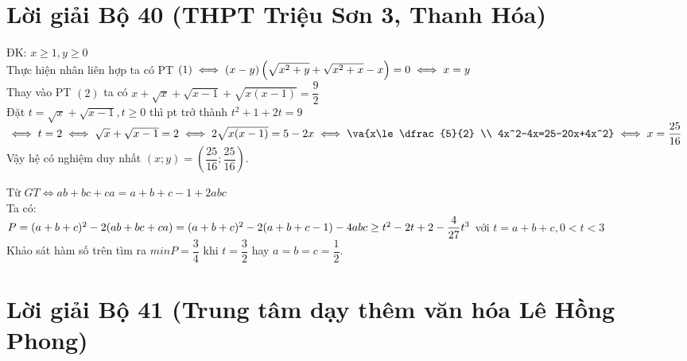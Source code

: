 \section{Lời giải Bộ 40 (THPT Triệu Sơn 3, Thanh Hóa)}

\lgi 
\vspace{5cm}

\hda 
ĐK: $x\ge 1,y\ge 0$\\
Thực hiện nhân liên hợp ta có PT $(1)\iff (x-y)\left(\sqrt{x^2+y}+\sqrt{x^2+x}-x\right)=0\\
\iff x=y$\\
Thay vào PT $(2)$ ta có $x+\sqrt{x}+\sqrt{x-1}+\sqrt{x(x-1)}=\dfrac{9}{2}$\\
Đặt $t=\sqrt{x}+\sqrt{x-1}, t\ge 0$ thì pt trở thành $t^2+1+2t=9$
$\iff t=2\\ \iff \sqrt{x}+\sqrt{x-1}=2\iff 2\sqrt{x(x-1)}=5-2x\\ \iff \va{x\le \dfrac{5}{2} \\ 4x^2-4x=25-20x+4x^2}\iff x=\dfrac{25}{16}$\\
Vậy hệ có nghiệm duy nhất $(x;y)=\left (\dfrac{25}{16};\dfrac{25}{16}\right)$.

\hda  
Từ $GT\iff ab+bc+ca=a+b+c-1+2abc$\\
Ta có: \\
$P=(a+b+c)^2-2(ab+bc+ca)=(a+b+c)^2-2(a+b+c-1)-4abc\\
\ge t^2-2t+2-\dfrac{4}{27}t^3$ với $t=a+b+c, 0<t<3$\\
Khảo sát hàm số trên tìm ra $minP=\dfrac{3}{4}$ khi $t=\dfrac{3}{2}$ hay $a=b=c=\dfrac{1}{2}$.

\section{Lời giải Bộ 41 (Trung tâm dạy thêm văn hóa Lê Hồng Phong)}

